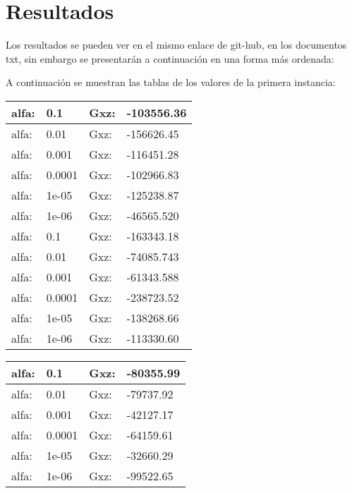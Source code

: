 \documentclass{article}
\theoremstyle{mytheoremstyle}
\theoremstyle{mytheoremstyle}
\theoremstyle{myproblemstyle}
\begin{document}
    \section{Resultados} 
    Los resultados se pueden ver en el mismo enlace de git-hub, en los documentos txt, sin embargo se presentarán a continuación en una forma más ordenada:
    
    A continuación se muestran las tablas de los valores de la primera instancia:
   	\begin{center}
   		\begin{table}[h!]
   			\begin{tabular}{|l|l|l|l|}
   				\hline
   				alfa: & 0.1    & Gxz: & -103556.36\\ \hline
   				alfa: & 0.01   & Gxz: & -156626.45\\ \hline
   				alfa: & 0.001  & Gxz: & -116451.28\\ \hline
   				alfa: & 0.0001 & Gxz: & -102966.83\\ \hline
   				alfa: & 1e-05  & Gxz: & -125238.87\\ \hline
   				alfa: & 1e-06  & Gxz: & -46565.520\\ \hline
   				alfa: & 0.1    & Gxz: & -163343.18\\ \hline
   				alfa: & 0.01   & Gxz: & -74085.743\\ \hline
   				alfa: & 0.001  & Gxz: & -61343.588\\ \hline
   				alfa: & 0.0001 & Gxz: & -238723.52\\ \hline
   				alfa: & 1e-05  & Gxz: & -138268.66\\ \hline
   				alfa: & 1e-06  & Gxz: & -113330.60\\ \hline
   			\end{tabular}
   		\end{table}
   	\end{center}
   \begin{table}[]
   	\begin{tabular}{|l|l|l|l|}
   		\hline
   		alfa: & 0.1    & Gxz: & -80355.99  \\ \hline
   		alfa: & 0.01   & Gxz: & -79737.92		\\ \hline
   		alfa: & 0.001  & Gxz: & -42127.17	\\ \hline
   		alfa: & 0.0001 & Gxz: & -64159.61	\\ \hline
   		alfa: & 1e-05  & Gxz: & -32660.29	\\ \hline
   		alfa: & 1e-06  & Gxz: & -99522.65	\\ \hline
   	\end{tabular}
   \end{table}
   
\end{document}

